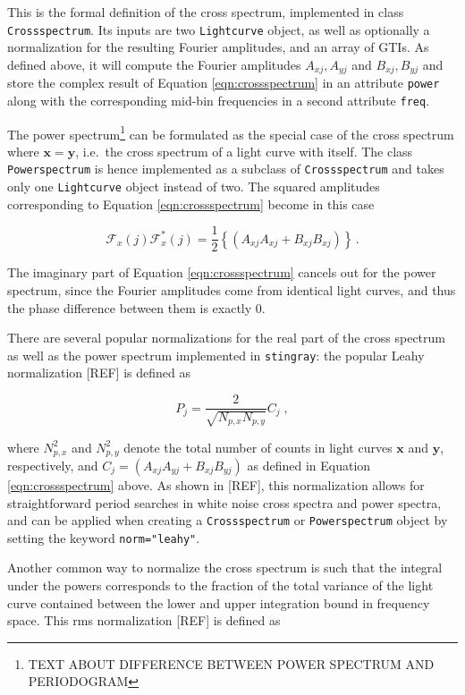 \documentclass[12pt]{emulateapj}
\newcommand{\stingray}{\texttt{stingray}\xspace}
\newcommand{\lightcurve}{\texttt{Lightcurve}\xspace}
\newcommand{\crossspectrum}{\texttt{Crossspectrum}\xspace}
\newcommand{\powerspectrum}{\texttt{Powerspectrum}\xspace}
\begin{document}
This is the formal definition of the cross spectrum, implemented in class \crossspectrum. Its inputs are two \lightcurve object, as well as optionally a normalization for the resulting Fourier amplitudes, and an array of GTIs. As defined above, it will compute the Fourier amplitudes $A_{xj}, A_{yj}$ and $B_{xj}, B_{yj}$ and store the complex result of Equation \ref{eqn:crossspectrum} in an attribute \texttt{power} along with the corresponding mid-bin frequencies in a second attribute \texttt{freq}.

The power spectrum\footnote{TEXT ABOUT DIFFERENCE BETWEEN POWER SPECTRUM AND PERIODOGRAM} can be formulated as the special case of the cross spectrum where $\mathbf{x} = \mathbf{y}$, i.e.\ the cross spectrum of a light curve with itself. The class \powerspectrum is hence implemented as a subclass of \crossspectrum and takes only one \lightcurve object instead of two. The squared amplitudes corresponding to Equation \ref{eqn:crossspectrum} become in this case

\begin{equation}
\mathcal{F}_x(j) \mathcal{F}_x^*(j) = \frac{1}{2} \left\{ (A_{xj}A_{xj} + B_{xj}B_{xj})\right\} \, .
\end{equation}

\noindent The imaginary part of Equation \ref{eqn:crossspectrum} cancels out for the power spectrum, since the Fourier amplitudes come from identical light curves, and thus the phase difference between them is exactly $0$. 

There are several popular normalizations for the real part of the cross spectrum as well as the power spectrum implemented in \stingray: the popular Leahy normalization [REF] is defined as 

\begin{equation}
P_j = \frac{2}{\sqrt{N_{p,x}N_{p,y}}} C_j \; ,
\end{equation}

\noindent where  $N_{p,x}^2$ and $N_{p,y}^2$ denote the total number of counts in light curves $\mathbf{x}$ and $\mathbf{y}$, respectively, and $C_j =  (A_{xj}A_{yj} + B_{xj}B_{yj}) $ as defined in Equation \ref{eqn:crossspectrum} above. As shown in [REF], this normalization allows for straightforward period searches in white noise cross spectra and power spectra, and can be applied when creating a \crossspectrum or \powerspectrum object by setting the keyword \verb|norm="leahy"|. 

Another common way to normalize the cross spectrum is such that the integral under the powers corresponds to the fraction of the total variance of the light curve contained between the lower and upper integration bound in frequency space. This rms normalization [REF] is defined as
\end{document}
